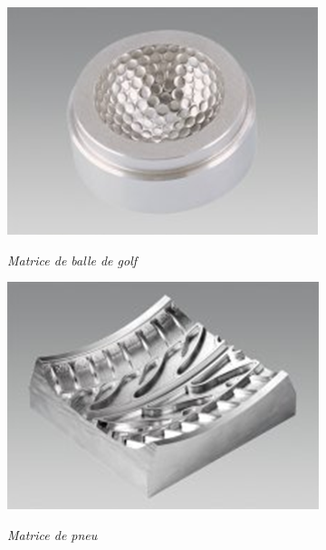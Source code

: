 \documentclass[11pt,oneside]{article}
\begin{document}
\begin{minipage}[c]{.24\linewidth}
\begin{center}
\includegraphics[width=.95\textwidth]{png/ex_1}

\textit{Matrice de balle de golf}
\end{center}
\end{minipage}\hfill
\begin{minipage}[c]{.24\linewidth}
\begin{center}
\includegraphics[width=.95\textwidth]{png/ex_2}

\textit{Matrice de pneu}
\end{center}
\end{minipage}\hfill
\end{document}
